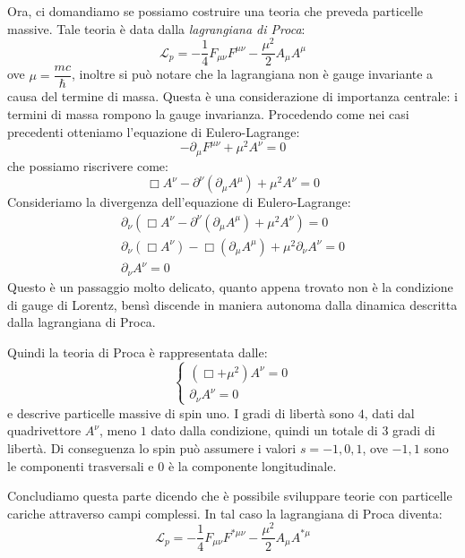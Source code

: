 Ora, ci domandiamo se possiamo costruire una teoria che preveda particelle massive. Tale teoria è data dalla \textit{lagrangiana di Proca}:
\begin{equation}
    \mathcal{L}_{p}=-\dfrac{1}{4} F_{\mu\nu}F^{\mu\nu}-\dfrac{\mu^2}{2}A_\mu A^\mu
\end{equation}
ove $\mu=\dfrac{mc}{\hbar}$, inoltre si può notare che la lagrangiana non è gauge invariante a causa del termine di massa. Questa è una considerazione di importanza centrale: i termini di massa rompono la gauge invarianza. Procedendo come nei casi precedenti otteniamo l'equazione di Eulero-Lagrange:
\begin{equation}
-\partial_\mu   F^{\mu\nu}+\mu^2A^\nu=0
\end{equation}
che possiamo riscrivere come:
\begin{equation}
\Box A^\nu-\partial^\nu(\partial_\mu A^\mu)+\mu^2A^\nu=0
\end{equation}
Consideriamo la divergenza dell'equazione di Eulero-Lagrange:
\begin{equation}
\begin{gathered}
    \partial_\nu(\Box A^\nu-\partial^\nu(\partial_\mu A^\mu)+\mu^2A^\nu)=0\\
    \partial_\nu(\Box A^\nu)-\Box(\partial_\mu A^\mu)+\mu^2\partial_\nu A^\nu=0\\
    \partial_\nu A^\nu=0
\end{gathered}
\end{equation}
Questo è un passaggio molto delicato, quanto appena trovato non è la condizione di gauge di Lorentz, bensì discende in maniera autonoma dalla dinamica descritta dalla lagrangiana di Proca. 

Quindi la teoria di Proca è rappresentata dalle:
\begin{equation}
    \begin{cases}
        (\Box+\mu^2)A^\nu=0\\
        \partial_\nu A^\nu=0
    \end{cases}
\end{equation}
e descrive particelle massive di spin uno. I gradi di libertà sono $4$, dati dal quadrivettore $A^\nu$, meno $1$ dato dalla condizione, quindi un totale di $3$ gradi di libertà. Di conseguenza lo spin può assumere i valori $s=-1,0,1$, ove $-1, 1$ sono le componenti trasversali e $0$ è la componente longitudinale.

Concludiamo questa parte dicendo che è possibile sviluppare teorie con particelle cariche attraverso campi complessi. In tal caso la lagrangiana di Proca diventa:
\begin{equation}
    \mathcal{L}_{p}=-\dfrac{1}{4} F_{\mu\nu}F^{*\mu\nu}-\dfrac{\mu^2}{2}A_\mu A^{*\mu}
\end{equation}
